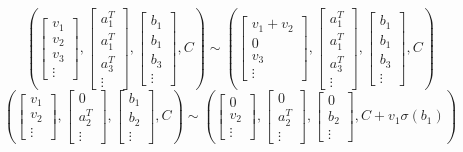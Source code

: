 \documentclass[11pt,letterpaper]{amsart}
\begin{document}
    $$
    \left(\begin{bmatrix}
        v_1 \\ v_2 \\ v_3\\ \vdots
    \end{bmatrix}, \begin{bmatrix}
        a_1^T \\ a_1^T \\ a_3^T\\ \vdots
    \end{bmatrix}, \begin{bmatrix}
        b_1 \\ b_1 \\ b_3\\ \vdots
    \end{bmatrix}, C\right) \sim \left(\begin{bmatrix}
        v_1 +v_2 \\ 0 \\ v_3 \\  \vdots
    \end{bmatrix}, \begin{bmatrix}
        a_1^T \\ a_1^T \\ a_3^T\\ \vdots
    \end{bmatrix}, \begin{bmatrix}
        b_1 \\ b_1 \\ b_3\\ \vdots
    \end{bmatrix}, C\right) 
    $$
    $$
    \left(\begin{bmatrix}
        v_1 \\ v_2 \\  \vdots
    \end{bmatrix}, \begin{bmatrix}
        0 \\ a_2^T \\ \vdots
    \end{bmatrix}, \begin{bmatrix}
        b_1 \\ b_2 \\ \vdots
    \end{bmatrix}, C\right) \sim \left(\begin{bmatrix}
        0 \\ v_2 \\  \vdots
    \end{bmatrix}, \begin{bmatrix}
        0 \\ a_2^T \\ \vdots
    \end{bmatrix}, \begin{bmatrix}
        0 \\ b_2 \\  \vdots
    \end{bmatrix}, C+v_1\sigma(b_1)\right)
    $$
\end{document}
